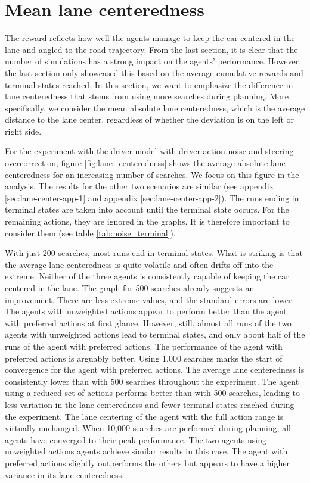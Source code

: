 

\section{Mean lane centeredness}
\label{sec:centeredness}

The reward reflects how well the agents manage to keep the car centered in the lane and angled to the road trajectory. From the last section, it is clear that the number of simulations has a strong impact on the agents' performance. However, the last section only showcased this based on the average cumulative rewards and terminal states reached. In this section, we want to emphasize the difference in lane centeredness that stems from using more searches during planning. More specifically, we consider the mean absolute lane centeredness, which is the average distance to the lane center, regardless of whether the deviation is on the left or right side.

For the experiment with the driver model with driver action noise and steering overcorrection, figure \ref{fig:lane_centeredness} shows the average absolute lane centeredness for an increasing number of searches. We focus on this figure in the analysis. The results for the other two scenarios are similar (see appendix \ref{sec:lane-center-app-1} and appendix \ref{sec:lane-center-app-2}). The runs ending in terminal states are taken into account until the terminal state occurs. For the remaining actions, they are ignored in the graphs. It is therefore important to consider them (see table \ref{tab:noise_terminal}). 

With just 200 searches, most runs end in terminal states. What is striking is that the average lane centeredness is quite volatile and often drifts off into the extreme. Neither of the three agents is consistently capable of keeping the car centered in the lane. The graph for 500 searches already suggests an improvement. There are less extreme values, and the standard errors are lower. The agents with unweighted actions appear to perform better than the agent with preferred actions at first glance. However, still, almost all runs of the two agents with unweighted actions lead to terminal states, and only about half of the runs of the agent with preferred actions. The performance of the agent with preferred actions is arguably better. Using 1,000 searches marks the start of convergence for the agent with preferred actions. The average lane centeredness is consistently lower than with 500 searches throughout the experiment. The agent using a reduced set of actions performs better than with 500 searches, leading to less variation in the lane centeredness and fewer terminal states reached during the experiment. The lane centering of the agent with the full action range is virtually unchanged. When 10,000 searches are performed during planning, all agents have converged to their peak performance. The two agents using unweighted actions agents achieve similar results in this case. The agent with preferred actions slightly outperforms the others but appears to have a higher variance in its lane centeredness.





